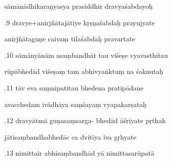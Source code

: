 \documentclass[article,12pt,a4paper]{memoir}%
\newcounter{parCount}
\begin{document}
	  
	  \pstart \leavevmode%
	sāmānādhikaraṇyasya prasiddhir dravyaśabdayoḥ 
	{}
	\pend%
      

	  
	  \pstart {}.9 dravye+anirjñātajātīye kṛṣṇaśabdaḥ prayujyate 
	{}
	\pend%
      

	  
	  \pstart \leavevmode%
	anirjñātaguṇe caivaṃ tilaśabdaḥ pravartate 
	{}
	\pend%
      

	  
	  \pstart {}.10 sāmānyānām asaṃbandhāt tau viśeṣe vyavasthitau 
	{}
	\pend%
      

	  
	  \pstart \leavevmode%
	rūpābhedād viśeṣaṃ tam abhivyaṅktuṃ na śaknutaḥ 
	{}
	\pend%
      

	  
	  \pstart {}.11 tāv eva saṃnipatitau bhedena pratipādane 
	{}
	\pend%
      

	  
	  \pstart \leavevmode%
	avacchedam ivādhāya saṃśayaṃ vyapakarṣataḥ 
	{}
	\pend%
      

	  
	  \pstart {}.12 dravyātmā guṇasaṃsarga- bhedād āśrīyate pṛthak 
	{}
	\pend%
      

	  
	  \pstart \leavevmode%
	jātisaṃbandhabhedāc ca dvitīya iva gṛhyate 
	{}
	\pend%
      

	  
	  \pstart {}.13 nimittair abhisaṃbandhād yā nimittasarūpatā 
	{}
	\pend%
      
\end{document}
